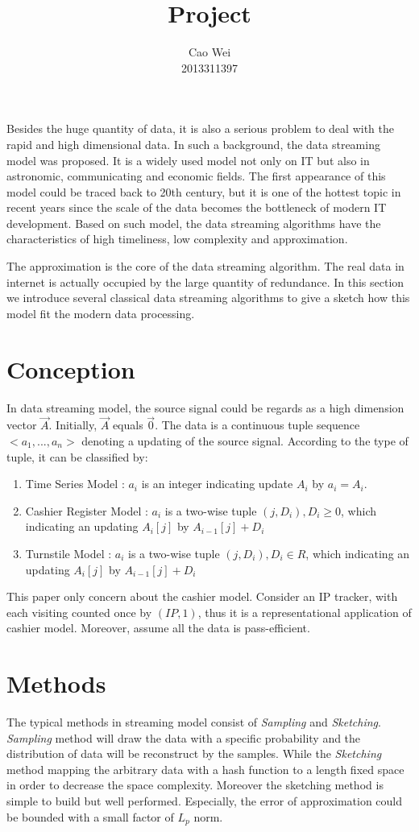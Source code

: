\documentclass[CJK, a4paper]{cctart}
\title{Project}
\author{Cao Wei \\ 2013311397}
\date{}
\begin{document}
\maketitle
\thispagestyle{fancy}
Besides the huge quantity of data, it is also a serious problem to deal with the rapid and high dimensional data. In such a background, the data streaming model was proposed. It is a widely used model not only on IT but also in astronomic, communicating and economic fields. The first appearance of this model could be traced back to 20th century, but it is one of the hottest topic in recent years since the scale of the data becomes the bottleneck of modern IT development. Based on such model, the data streaming algorithms have the characteristics of high timeliness, low complexity and approximation.

The approximation is the core of the data streaming algorithm. The real data in internet is actually occupied by the large quantity of redundance. In this section we introduce several classical data streaming algorithms to give a sketch how this model fit the modern data processing.

\section{Conception}
In data streaming model, the source signal could be regards as a high dimension vector $\vec{A}$. Initially, $\vec{A}$ equals $\vec{0}$.  The data is a continuous tuple sequence $<a_1, ..., a_n>$ denoting a updating of the source signal. According to the type of tuple, it can be classified by:
\begin{enumerate}
\item Time Series Model : $a_i$ is an integer indicating update $A_i$ by $a_i = A_i$.
\item Cashier Register Model : $a_i$ is a two-wise tuple $(j, D_i), D_i \ge 0$, which indicating an updating $A_i[j]$ by $A_{i-1}[j] + D_i$
\item Turnstile Model : $a_i$ is a two-wise tuple $(j, D_i), D_i \in R$, which indicating an updating $A_i[j]$ by $A_{i-1}[j] + D_i$
\end{enumerate}
This paper only concern about the cashier model. Consider an IP tracker, with each visiting counted once by $(IP, 1)$, thus it is a representational application of cashier model. Moreover, assume all the data is pass-efficient.

\section{Methods}
The typical methods in streaming model consist of \emph{Sampling} and \emph{Sketching}. \emph{Sampling} method will draw the data with a specific probability and the distribution of data will be reconstruct by the samples. While the \emph{Sketching} method mapping the arbitrary data with a hash function to a length fixed space in order to decrease the space complexity. Moreover the sketching method is simple to build but well performed. Especially, the error of approximation could be bounded with a small factor of $L_p$ norm.
\end{document}
